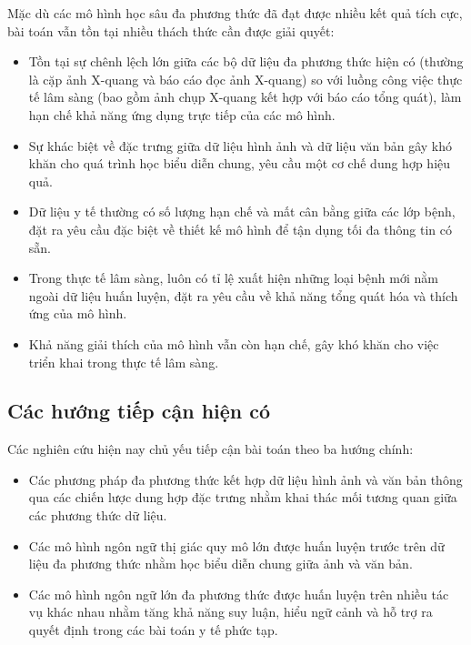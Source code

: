 Mặc dù các mô hình học sâu đa phương thức đã đạt được nhiều kết quả tích cực, bài toán vẫn tồn tại nhiều thách thức cần được giải quyết:

\begin{itemize}
    \item Tồn tại sự chênh lệch lớn giữa các bộ dữ liệu đa phương thức hiện có (thường là cặp ảnh X-quang và báo cáo đọc ảnh X-quang) 
    so với luồng công việc thực tế lâm sàng (bao gồm ảnh chụp X-quang kết hợp với báo cáo tổng quát), làm hạn chế khả năng ứng dụng trực tiếp của các mô hình.
    \item Sự khác biệt về đặc trưng giữa dữ liệu hình ảnh và dữ liệu văn bản gây khó khăn cho quá trình học biểu diễn chung, yêu cầu một cơ chế dung hợp hiệu quả.
    \item Dữ liệu y tế thường có số lượng hạn chế và mất cân bằng giữa các lớp bệnh, đặt ra yêu cầu đặc biệt về thiết kế mô hình để tận dụng tối đa thông tin có sẵn.
    \item Trong thực tế lâm sàng, luôn có tỉ lệ xuất hiện những loại bệnh mới nằm ngoài dữ liệu huấn luyện, đặt ra yêu cầu về khả năng tổng quát hóa và thích ứng của mô hình.
    \item Khả năng giải thích của mô hình vẫn còn hạn chế, gây khó khăn cho việc triển khai trong thực tế lâm sàng.
\end{itemize}

\subsection{Các hướng tiếp cận hiện có}
Các nghiên cứu hiện nay chủ yếu tiếp cận bài toán theo ba hướng chính:

\begin{itemize}
    \item Các phương pháp đa phương thức kết hợp dữ liệu hình ảnh và văn bản thông qua các chiến lược dung hợp đặc trưng nhằm khai thác mối tương quan giữa các phương thức dữ liệu.
    \item Các mô hình ngôn ngữ thị giác quy mô lớn được huấn luyện trước trên dữ liệu đa phương thức nhằm học biểu diễn chung giữa ảnh và văn bản.
    \item Các mô hình ngôn ngữ lớn đa phương thức được huấn luyện trên nhiều tác vụ khác nhau nhằm tăng khả năng suy luận, hiểu ngữ cảnh và hỗ trợ ra quyết định trong các bài toán y tế phức tạp.
\end{itemize}

